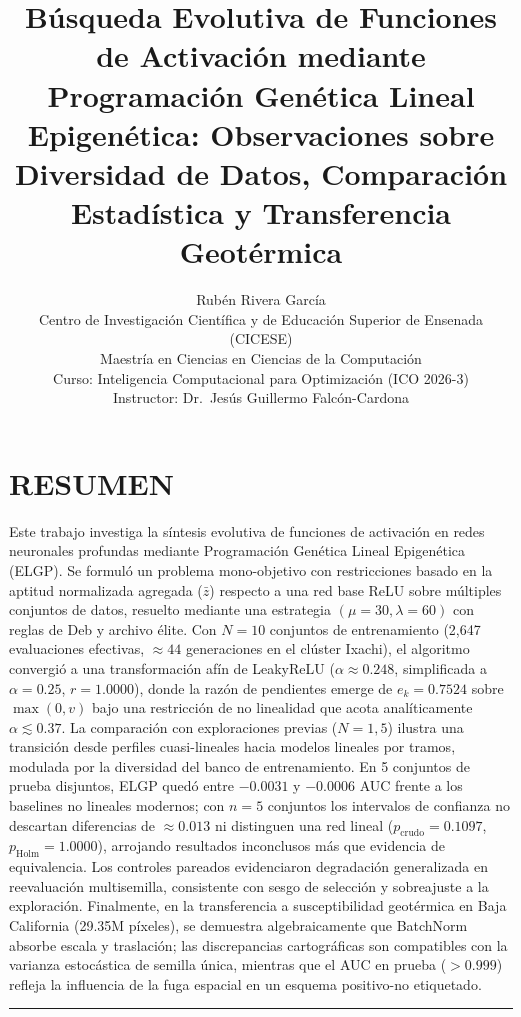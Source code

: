 \documentclass[10pt,twocolumn,letterpaper]{article}
\title{\vspace{-1.2cm}\Large\bfseries Búsqueda Evolutiva de Funciones de Activación mediante Programación Genética Lineal Epigenética: Observaciones sobre Diversidad de Datos, Comparación Estadística y Transferencia Geotérmica}
\author{
    \large Rubén Rivera García \\
    \normalsize Centro de Investigación Científica y de Educación Superior de Ensenada (CICESE) \\
    \normalsize Maestría en Ciencias en Ciencias de la Computación \\
    \normalsize Curso: Inteligencia Computacional para Optimización (ICO 2026-3) \\
    \normalsize Instructor: Dr.\ Jesús Guillermo Falcón-Cardona
}
\date{}
\begin{document}
\maketitle

\section*{RESUMEN}
Este trabajo investiga la síntesis evolutiva de funciones de activación en redes neuronales profundas mediante Programación Genética Lineal Epigenética (ELGP). Se formuló un problema mono-objetivo con restricciones basado en la aptitud normalizada agregada ($\bar{z}$) respecto a una red base ReLU sobre múltiples conjuntos de datos, resuelto mediante una estrategia $(\mu=30, \lambda=60)$ con reglas de Deb y archivo élite. Con $N=10$ conjuntos de entrenamiento (2{,}647 evaluaciones efectivas, $\approx 44$ generaciones en el clúster Ixachi), el algoritmo convergió a una transformación afín de LeakyReLU ($\alpha \approx 0.248$, simplificada a $\alpha = 0.25$, $r = 1.0000$), donde la razón de pendientes emerge de $e_k = 0.7524$ sobre $\max(0, v)$ bajo una restricción de no linealidad que acota analíticamente $\alpha \lesssim 0.37$. La comparación con exploraciones previas ($N=1, 5$) ilustra una transición desde perfiles cuasi-lineales hacia modelos lineales por tramos, modulada por la diversidad del banco de entrenamiento. En 5 conjuntos de prueba disjuntos, ELGP quedó entre $-0.0031$ y $-0.0006$ AUC frente a los baselines no lineales modernos; con $n=5$ conjuntos los intervalos de confianza no descartan diferencias de $\approx 0.013$ ni distinguen una red lineal ($p_{\mathrm{crudo}}=0.1097$, $p_{\mathrm{Holm}}=1.0000$), arrojando resultados inconclusos más que evidencia de equivalencia. Los controles pareados evidenciaron degradación generalizada en reevaluación multisemilla, consistente con sesgo de selección y sobreajuste a la exploración. Finalmente, en la transferencia a susceptibilidad geotérmica en Baja California (29.35M píxeles), se demuestra algebraicamente que BatchNorm absorbe escala y traslación; las discrepancias cartográficas son compatibles con la varianza estocástica de semilla única, mientras que el AUC en prueba ($>0.999$) refleja la influencia de la fuga espacial en un esquema positivo-no etiquetado.

\vspace{0.3em}
\hrule
\vspace{0.4em}

\end{document}
